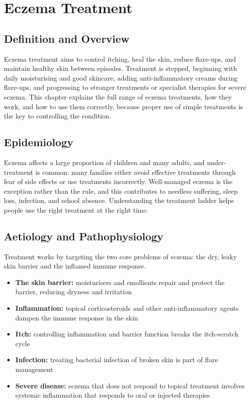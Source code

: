 \chapter{Eczema Treatment}

\section*{Definition and Overview}
Eczema treatment aims to control itching, heal the skin, reduce flare-ups, and maintain healthy skin between episodes. Treatment is stepped, beginning with daily moisturising and good skincare, adding anti-inflammatory creams during flare-ups, and progressing to stronger treatments or specialist therapies for severe eczema. This chapter explains the full range of eczema treatments, how they work, and how to use them correctly, because proper use of simple treatments is the key to controlling the condition.

\section*{Epidemiology}
Eczema affects a large proportion of children and many adults, and under-treatment is common: many families either avoid effective treatments through fear of side effects or use treatments incorrectly. Well-managed eczema is the exception rather than the rule, and this contributes to needless suffering, sleep loss, infection, and school absence. Understanding the treatment ladder helps people use the right treatment at the right time.

\section*{Aetiology and Pathophysiology}
Treatment works by targeting the two core problems of eczema: the dry, leaky skin barrier and the inflamed immune response.
\begin{itemize}
    \item \textbf{The skin barrier:} moisturisers and emollients repair and protect the barrier, reducing dryness and irritation
    \item \textbf{Inflammation:} topical corticosteroids and other anti-inflammatory agents dampen the immune response in the skin
    \item \textbf{Itch:} controlling inflammation and barrier function breaks the itch-scratch cycle
    \item \textbf{Infection:} treating bacterial infection of broken skin is part of flare management
    \item \textbf{Severe disease:} eczema that does not respond to topical treatment involves systemic inflammation that responds to oral or injected therapies
\end{itemize}

